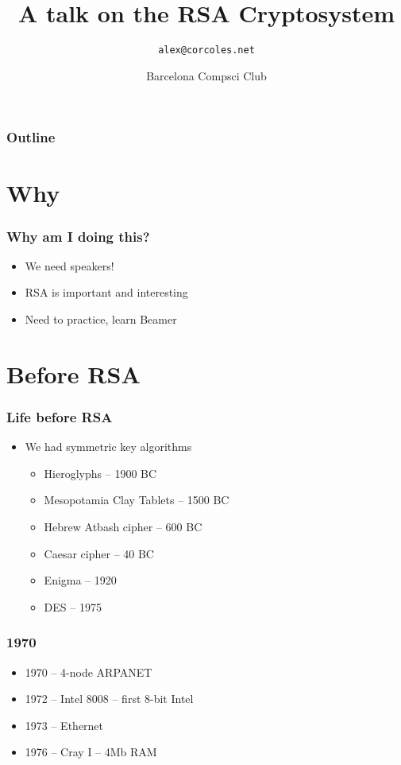 \documentclass{beamer}
\title{A talk on the RSA Cryptosystem}
\author{\texttt{alex@corcoles.net}}
\date{Barcelona Compsci Club}
\begin{document}
\begin{frame}
	\titlepage
\end{frame}

\begin{frame}
	\frametitle{Outline}
	\tableofcontents
\end{frame}

\section{Why}

\begin{frame}
	\frametitle{Why am I doing this?}
	\begin{itemize}
		\item We need speakers!
		\item RSA is important and interesting
		\item Need to practice, learn Beamer
	\end{itemize}
\end{frame}

\section{Before RSA}

\begin{frame}
	\frametitle{Life before RSA}
	\begin{itemize}
		\item We had symmetric key algorithms
		\begin{itemize}
			\item Hieroglyphs -- 1900 BC
			\item Mesopotamia Clay Tablets -- 1500 BC
			\item Hebrew Atbash cipher -- 600 BC
			\item Caesar cipher -- 40 BC
			\item Enigma -- 1920
			\item DES -- 1975
		\end{itemize}
	\end{itemize}
\end{frame}

\begin{frame}
	\frametitle{1970}
	\begin{itemize}
		\item 1970 -- 4-node ARPANET
		\item 1972 -- Intel 8008 -- first 8-bit Intel
		\item 1973 -- Ethernet
		\item 1976 -- Cray I -- 4Mb RAM
	\end{itemize}
\end{frame}
\end{document}

